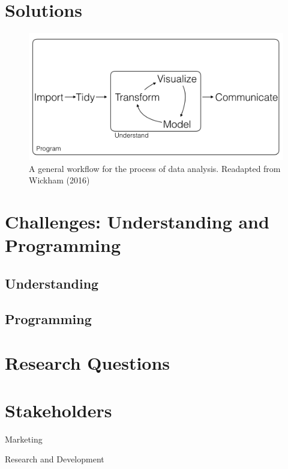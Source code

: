 \documentclass[]{book}
\begin{document}
\section{Solutions}\label{solutions}

\begin{figure}

{\centering \includegraphics[width=0.8\linewidth]{_bookdown_files/figures/main_work_flow} 

}

\caption{A general workflow for the process of data analysis. Readapted from Wickham (2016)}\label{fig:mainworkflow}
\end{figure}

\section{Challenges: Understanding and
Programming}\label{challenges-understanding-and-programming}

\subsection{Understanding}\label{understanding}

\subsection{Programming}\label{programming}

\section{Research Questions}\label{research-questions}

\section{Stakeholders}\label{stakeholders}

Marketing

Research and Development
\end{document}
